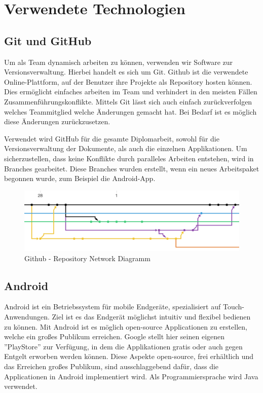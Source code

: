 \chapter{Verwendete Technologien}
\section{Git und GitHub}
Um als Team dynamisch arbeiten zu können, verwenden wir Software zur Versionsverwaltung. Hierbei handelt es sich um Git. 
Github ist die verwendete Online-Plattform, auf der Benutzer ihre Projekte als Repository hosten können. Dies ermöglicht einfaches arbeiten im Team und verhindert in den meisten Fällen Zusammenführungskonflikte. Mittels Git lässt sich auch einfach zurückverfolgen welches Teammitglied welche Änderungen gemacht hat. Bei Bedarf ist es möglich diese Änderungen zurückzusetzen.

Verwendet wird GitHub für die gesamte Diplomarbeit, sowohl für die Versionsverwaltung der Dokumente, als auch die einzelnen Applikationen. Um sicherzustellen, dass keine Konflikte durch paralleles Arbeiten entstehen, wird in Branches gearbeitet. Diese Branches wurden erstellt, wenn ein neues Arbeitspaket begonnen wurde, zum Beispiel die Android-App.

\begin{figure}[H]
\centering
\includegraphics[width=1\textwidth]{images/04_VerwendeteTechnologien/network.png}
\caption{Github - Repository Network Diagramm}
\label{img:githubnetwork}
\end{figure}


\section{Android}

Android ist ein Betriebssystem für mobile Endgeräte, spezialisiert auf Touch-Anwendungen. Ziel ist es das Endgerät möglichst intuitiv und flexibel bedienen zu können. Mit Android ist es möglich open-source Applicationen zu erstellen, welche ein großes Publikum erreichen. Google stellt hier seinen eigenen ''PlayStore'' zur Verfügung, in dem die Applikationen gratis oder auch gegen Entgelt erworben werden können.
Diese Aspekte open-source, frei erhältlich und das Erreichen großes Publikum, sind ausschlaggebend dafür, dass die Applicationen in Android implementiert wird. Als Programmiersprache wird Java verwendet.
\\
